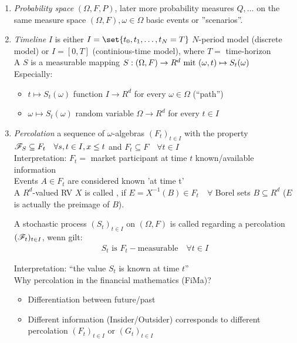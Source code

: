 \begin{enumerate}
	\item \emph{Probability space} $(\Omega,F,P)$, later more probability measures $Q, \dots$ on the same measure space $(\Omega,F), \omega \in \Omega$ basic events or ''scenarios''.
	
	\newpage
	\item \emph{Timeline} $I$ is either $I=\set{t_0, t_1, \dots, t_N=T}$ $N$-period model (discrete model) or $I = [0,T]$ (continious-time model), where $T = $ time-horizon\\
	
	A  $S$ is a measurable mapping $S: (\Omega,F) \to R^d \mit (\omega, t) \mapsto S_t(\omega)$\\
	Especially:
	\begin{itemize}
		\item $t \mapsto S_t(\omega)$ function $I \to R^d$ for every $\omega \in \Omega$ (``path'')
		\item $\omega \mapsto S_t(\omega)$ random variable $\Omega \to R^d$ for every $t \in I$
	\end{itemize}
	\item \emph{Percolation} 
	a sequence of $\omega$-algebras $(F_t)_{t \in I}$ with the property $\F_S \subseteq F_t \quad \forall s,t \in I, x \le t$ and $F_t \subseteq F\quad \forall t \in I$\\
	Interpretation: $F_t=$ market participant at time $t$ known/available information\\
	Events $A \in F_t$ are considered known 'at time t'\\
	
	A $R^d$-valued RV $X$ is called  , if $E = X^{-1}(B) \in F_t \quad \forall$ Borel sets $B \subseteq R^d$ ($E$ is actually the preimage of $B$).
	
	\begin{*example}
		A stochastic process  $(S_t)_{t\in I}$ on $(\Omega,F)$ is called  regarding a percolation $(\F_t)_{t \in I}$, wenn gilt:
		\begin{align*}
			S_t \text{ is } F_t-\text{measurable} \quad \forall t \in I
		\end{align*}
	\end{*example}
	Interpretation: ``the value $S_t$ is known at time $t$''\\
	Why percolation in the financial mathematics (FiMa)?
	\begin{itemize}
		\item Differentiation between future/past
		\item Different information (Insider/Outsider) corresponds to different percolation $(F_t)_{t \in I}$ or $(G_t)_{t\in I}$
	\end{itemize}
	

\end{enumerate}
